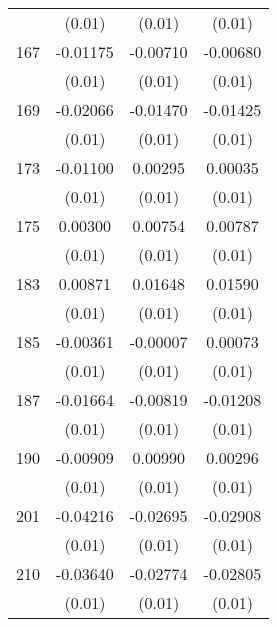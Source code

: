 \begin{table}[htbp]
\begin{tabular}{l*{3}{c}}
                    &      (0.01)         &      (0.01)         &      (0.01)         \\
167                 &    -0.01175         &    -0.00710         &    -0.00680         \\
                    &      (0.01)         &      (0.01)         &      (0.01)         \\
169                 &    -0.02066\sym{**} &    -0.01470         &    -0.01425         \\
                    &      (0.01)         &      (0.01)         &      (0.01)         \\
173                 &    -0.01100         &     0.00295         &     0.00035         \\
                    &      (0.01)         &      (0.01)         &      (0.01)         \\
175                 &     0.00300         &     0.00754         &     0.00787         \\
                    &      (0.01)         &      (0.01)         &      (0.01)         \\
183                 &     0.00871         &     0.01648         &     0.01590         \\
                    &      (0.01)         &      (0.01)         &      (0.01)         \\
185                 &    -0.00361         &    -0.00007         &     0.00073         \\
                    &      (0.01)         &      (0.01)         &      (0.01)         \\
187                 &    -0.01664         &    -0.00819         &    -0.01208         \\
                    &      (0.01)         &      (0.01)         &      (0.01)         \\
190                 &    -0.00909         &     0.00990         &     0.00296         \\
                    &      (0.01)         &      (0.01)         &      (0.01)         \\
201                 &    -0.04216\sym{***}&    -0.02695\sym{**} &    -0.02908\sym{**} \\
                    &      (0.01)         &      (0.01)         &      (0.01)         \\
210                 &    -0.03640\sym{***}&    -0.02774\sym{**} &    -0.02805\sym{**} \\
                    &      (0.01)         &      (0.01)         &      (0.01)         \\

\end{tabular}
\end{table}
